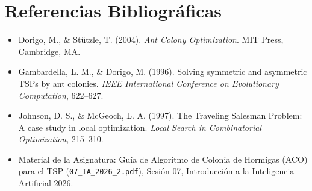 \documentclass[11pt,a4paper]{article}
\begin{document}
\section*{Referencias Bibliográficas}
\begin{itemize}
    \item Dorigo, M., \& Stützle, T. (2004). \emph{Ant Colony Optimization}. MIT Press, Cambridge, MA.
    \item Gambardella, L. M., \& Dorigo, M. (1996). Solving symmetric and asymmetric TSPs by ant colonies. \emph{IEEE International Conference on Evolutionary Computation}, 622--627.
    \item Johnson, D. S., \& McGeoch, L. A. (1997). The Traveling Salesman Problem: A case study in local optimization. \emph{Local Search in Combinatorial Optimization}, 215--310.
    \item Material de la Asignatura: Guía de Algoritmo de Colonia de Hormigas (ACO) para el TSP (\texttt{07\_IA\_2026\_2.pdf}), Sesión 07, Introducción a la Inteligencia Artificial 2026.
\end{itemize}
\end{document}
